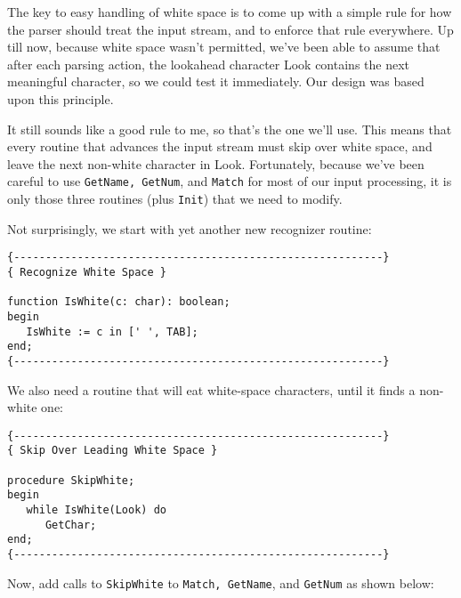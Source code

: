 The  key  to easy handling of white space is to come  up  with  a simple rule for how the parser should treat the input stream, and to  enforce that rule everywhere. Up  till  now, because  white space wasn't permitted, we've been able to assume that after each parsing action, the lookahead character  Look  contains  the next meaningful  character, so  we could test it  immediately. Our design was based upon this principle.

It still sounds like a good rule to me, so  that's  the one we'll use. This  means  that  every routine that advances the  input stream must skip over white space, and leave  the  next non-white character in Look. Fortunately, because  we've been careful to use {\tt GetName, GetNum}, and {\tt Match} for most of our input processing, it is  only  those  three  routines  (plus {\tt Init}) that we need to modify.

Not  surprisingly, we  start  with  yet  another  new recognizer routine:

\begin{verbatim}
{----------------------------------------------------------}
{ Recognize White Space }

function IsWhite(c: char): boolean;
begin
   IsWhite := c in [' ', TAB];
end;
{----------------------------------------------------------}
\end{verbatim}

We  also need a routine that  will  eat  white-space
characters, until it finds a non-white one:

\begin{verbatim}
{----------------------------------------------------------}
{ Skip Over Leading White Space }

procedure SkipWhite;
begin
   while IsWhite(Look) do
      GetChar;
end;
{----------------------------------------------------------}
\end{verbatim}

Now, add calls to {\tt SkipWhite} to {\tt Match, GetName}, and
{\tt GetNum}  as shown below:

